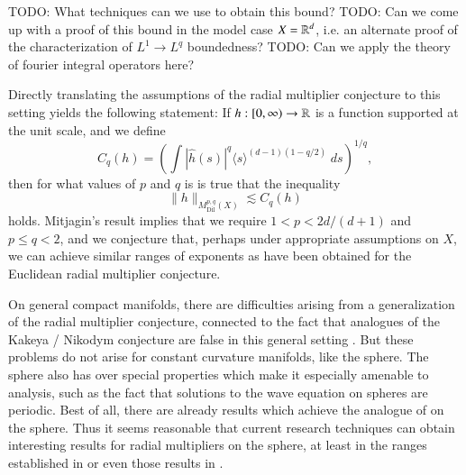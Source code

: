 TODO: What techniques can we use to obtain this bound? TODO: Can we come up with a proof of this bound in the model case $X = \operatorname{\mathbb{R}}^d$, i.e. an alternate proof of the characterization of $L^1 \to L^q$ boundedness? TODO: Can we apply the theory of fourier integral operators here?
%
%
%

Directly translating the assumptions of the radial multiplier conjecture to this setting yields the following statement: If $h: [0,\infty) \to \operatorname{\mathbb{R}}$ is a function supported at the unit scale, and we define
%
\[ C_q(h) = \left( \int |\widehat{h}(s)|^q \langle s \rangle^{(d-1)(1 - q/2)}\; ds \right)^{1/q}, \]
%
then for what values of $p$ and $q$ is is true that the inequality
%
\[ \| h \|_{M^{p,q}_{\text{Dil}}(X)} \lesssim C_q(h) \]
%
holds. Mitjagin's result implies that we require $1 < p < 2d/(d+1)$ and $p \leq q < 2$, and we conjecture that, perhaps under appropriate assumptions on $X$, we can achieve similar ranges of exponents as have been obtained for the Euclidean radial multiplier conjecture.

On general compact manifolds, there are difficulties arising from a generalization of the radial multiplier conjecture, connected to the fact that analogues of the Kakeya / Nikodym conjecture are false in this general setting \cite{Minicozzi}. But these problems do not arise for constant curvature manifolds, like the sphere. The sphere also has over special properties which make it especially amenable to analysis, such as the fact that solutions to the wave equation on spheres are periodic. Best of all, there are already results which achieve the analogue of \cite{GarrigosandSeeger} on the sphere. Thus it seems reasonable that current research techniques can obtain interesting results for radial multipliers on the sphere, at least in the ranges established in \cite{HeoandNazarovandSeeger} or even those results in \cite{Cladek}.

